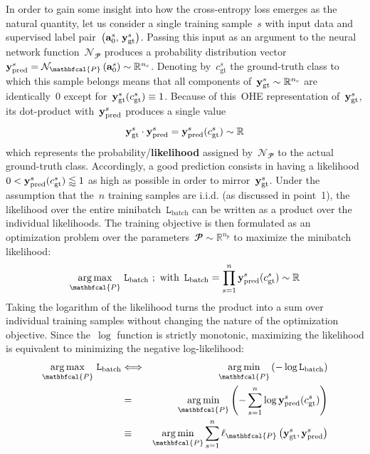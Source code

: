 \documentclass{article}
\DeclareMathOperator*{\argmax}{arg\,max}
\DeclareMathOperator*{\argmin}{arg\,min}
\begin{document}
\begin{enumerate}
In order to gain some insight into how the cross-entropy loss emerges as the natural quantity, let us consider a single training sample~$s$ with input data and supervised label pair~$\left( {\bf a}_0^s , \, {\bf y}_\text{gt}^s \right)$.  Passing this input as an argument to the neural network function~$\mathcal{N}_{\mathbfcal{P}}$ produces a probability distribution vector~${\bf y}^s_\text{pred} = \mathcal{N}_{\mathbfcal{P}} \left( {\bf a}_0^s \right) \sim \mathbb{R}^{n_c}$.  Denoting by~$c^s_\text{gt}$ the ground-truth class to which this sample belongs means that all components of~${\bf y}^s_\text{gt} \sim \mathbb{R}^{n_c}$ are identically~0 except for~${\bf y}^s_\text{gt} (c_\text{gt}^s) \equiv 1$. Because of this~OHE representation of~${\bf y}_\text{gt}^s$, its dot-product with~${\bf y}_\text{pred}^s$ produces a single value
\begin{equation*}
{\bf y}_\text{gt}^s \cdot {\bf y}_\text{pred}^s = {\bf y}_\text{pred}^s (c_\text{gt}^s ) \sim \mathbb{R}
\end{equation*}
which represents the probability/{\bf likelihood} assigned by~$\mathcal{N}_{\mathbfcal{P}}$ to the actual ground-truth class.  Accordingly, a good prediction consists in having a likelihood~$0 < {\bf y}^s_\text{pred} (c_\text{gt}^s) \lessapprox 1$ as high as possible in order to mirror~${\bf y}^s_\text{gt}$. Under the assumption that the~$n$ training samples are i.i.d. (as discussed in point~1), the likelihood over the entire minibatch~$\mathtt{L}_\text{batch}$ can be written as a product over the individual likelihoods.  The training objective is then formulated as an optimization problem over the parameters~$\mathbfcal{P} \sim \mathbb{R}^{n_p}$ to maximize the minibatch likelihood:
\begin{equation*} 
\argmax_\mathbfcal{P} \, \mathtt{L}_\text{batch} \,\, ; \,\, \text{with} \,\,\, \mathtt{L}_\text{batch} = \prod_{s=1}^n {\bf y}_\text{pred}^s (c_\text{gt}^s ) \sim \mathbb{R}
\end{equation*}
Taking the logarithm of the likelihood turns the product into a sum over individual training samples without changing the nature of the optimization objective. Since the~$\log$ function is strictly monotonic, maximizing the likelihood is equivalent to minimizing the negative log-likelihood:
\begin{eqnarray*}
\argmax_\mathbfcal{P} \, \mathtt{L}_\text{batch} &\Longleftrightarrow& \argmin_\mathbfcal{P} \left( - \log \mathtt{L}_\text{batch} \right) \\
&=& \argmin_\mathbfcal{P} \left( - \sum_{s=1}^n \log {\bf y}_\text{pred}^s (c_\text{gt}^s ) \right) \\
&\equiv& \argmin_\mathbfcal{P} \sum_{s=1}^n  {\bf \ell}_\mathbfcal{P} \left( {\bf y}^s_\text{gt}, {\bf y}^s_\text{pred} \right)
\end{eqnarray*}



\end{enumerate}
\end{document}
